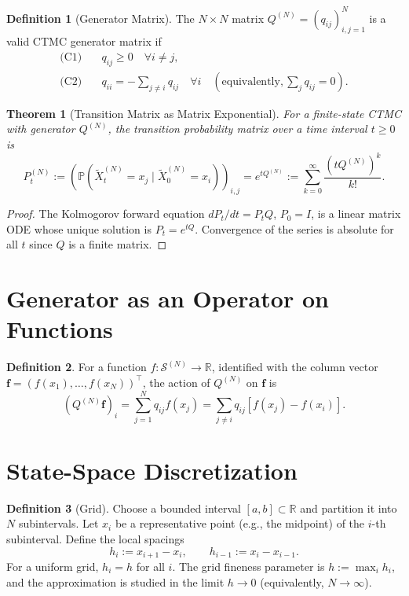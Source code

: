 \documentclass[11pt,a4paper,openany]{book}
\theoremstyle{definition}
\newtheorem{definition}{Definition}[chapter]
\theoremstyle{plain}
\newtheorem{theorem}{Theorem}[chapter]
\theoremstyle{remark}
\newcommand{\1}{\mathbbm{1}}
\newcommand{\R}{\mathbb{R}}
\newcommand{\Pbb}{\mathbb{P}}
\newcommand{\calS}{\mathcal{S}}
\begin{document}
\begin{definition}[Generator Matrix]
The $N \times N$ matrix $Q^{(N)} = (q_{ij})_{i,j=1}^{N}$ is a valid CTMC generator matrix if
\begin{align}
\text{(C1)} &\quad q_{ij} \geq 0 \quad \forall i \neq j, \\
\text{(C2)} &\quad q_{ii} = -\sum_{j \neq i} q_{ij} \quad \forall i \quad (\text{equivalently}, \sum_{j} q_{ij} = 0).
\end{align}
\end{definition}

\begin{theorem}[Transition Matrix as Matrix Exponential]
For a finite-state CTMC with generator $Q^{(N)}$, the transition probability matrix over a time interval $t \geq 0$ is
\[
P_{t}^{(N)} := \left(\Pbb(\widetilde{X}_{t}^{(N)} = x_{j} \mid \widetilde{X}_{0}^{(N)} = x_{i})\right)_{i,j} = e^{t Q^{(N)}} := \sum_{k=0}^{\infty} \frac{(t Q^{(N)})^{k}}{k!}.
\]
\end{theorem}

\begin{proof}
The Kolmogorov forward equation $dP_{t}/dt = P_{t} Q$, $P_{0} = I$, is a linear matrix ODE whose unique solution is $P_{t} = e^{tQ}$. Convergence of the series is absolute for all $t$ since $Q$ is a finite matrix.
\end{proof}

\section{Generator as an Operator on Functions}

\begin{definition}
For a function $f: \calS^{(N)} \to \R$, identified with the column vector $\mathbf{f} = (f(x_{1}), \ldots, f(x_{N}))^{\top}$, the action of $Q^{(N)}$ on $\mathbf{f}$ is
\[
(Q^{(N)} \mathbf{f})_{i} = \sum_{j=1}^{N} q_{ij} f(x_{j}) = \sum_{j \neq i} q_{ij} [f(x_{j}) - f(x_{i})].
\]
\end{definition}

\section{State-Space Discretization}

\begin{definition}[Grid]
Choose a bounded interval $[a, b] \subset \R$ and partition it into $N$ subintervals. Let $x_{i}$ be a representative point (e.g., the midpoint) of the $i$-th subinterval. Define the local spacings
\[
h_{i} := x_{i+1} - x_{i}, \qquad h_{i-1} := x_{i} - x_{i-1}.
\]
For a uniform grid, $h_{i} = h$ for all $i$. The grid fineness parameter is $h := \max_{i} h_{i}$, and the approximation is studied in the limit $h \to 0$ (equivalently, $N \to \infty$).
\end{definition}
\end{document}
